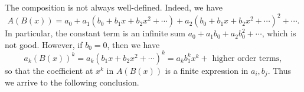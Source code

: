 

\setcounter{section}{2}
\setcounter{subsection}{2}
\setcounter{dfn}{5}

The composition is not always well-defined. Indeed, we have
\[
A(B(x)) = a_0 + a_1(b_0 + b_1 x + b_2 x^2 + \cdots) + a_2(b_0 + b_1 x + b_2 x^2 + \cdots)^2 + \cdots.
\]
In particular, the constant term is an infinite sum $a_0 + a_1 b_0 + a_2 b_0^2 + \cdots$, which is not good.
However, if $b_0 = 0$, then we have
\[
a_k (B(x))^k = a_k (b_1 x + b_2 x^2 + \cdots)^k = a_k b_1^k x^k + \text{ higher order terms},
\]
so that the coefficient at $x^k$ in $A(B(x))$ is a finite expression in $a_i, b_j$.
Thus we arrive to the following conclusion.



